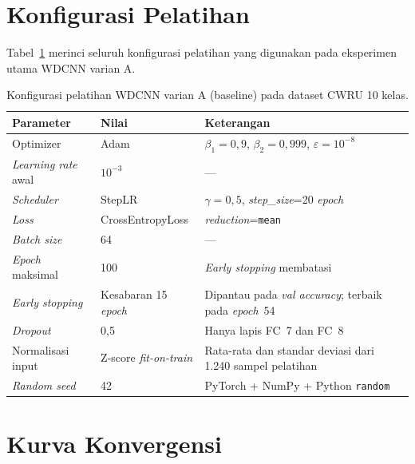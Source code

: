 \section{Konfigurasi Pelatihan}
\label{lamp:wdcnn_training}

Tabel~\ref{tab:lampG_training} merinci seluruh konfigurasi
pelatihan yang digunakan pada eksperimen utama WDCNN varian A.

\begin{table}[ht]
  \centering
  \caption{Konfigurasi pelatihan WDCNN varian A (baseline) pada
           dataset CWRU 10 kelas.}
  \label{tab:lampG_training}
  \footnotesize
  \begin{tabularx}{\textwidth}{@{}l X X@{}}
    \toprule
    \textbf{Parameter} & \textbf{Nilai} & \textbf{Keterangan} \\
    \midrule
    Optimizer          & Adam            & $\beta_1=0,9$, $\beta_2=0,999$, $\varepsilon=10^{-8}$ \\
    \emph{Learning rate} awal & $10^{-3}$ & --- \\
    \emph{Scheduler}   & StepLR          & $\gamma=0{,}5$, \emph{step\_size}=20 \emph{epoch} \\
    \emph{Loss}        & CrossEntropyLoss & \emph{reduction}=\texttt{mean} \\
    \emph{Batch size}  & 64              & ---\\
    \emph{Epoch} maksimal & 100          & \emph{Early stopping} membatasi \\
    \emph{Early stopping} & Kesabaran 15 \emph{epoch} &
      Dipantau pada \emph{val accuracy}; terbaik pada \emph{epoch}~54 \\
    \emph{Dropout}     & 0,5             & Hanya lapis FC~7 dan FC~8 \\
    Normalisasi input  & Z-score \emph{fit-on-train} &
      Rata-rata dan standar deviasi dari 1.240 sampel pelatihan \\
    \emph{Random seed} & 42              & PyTorch + NumPy + Python \texttt{random} \\
    \bottomrule
  \end{tabularx}
\end{table}

\section{Kurva Konvergensi}
\label{lamp:wdcnn_konvergensi}

